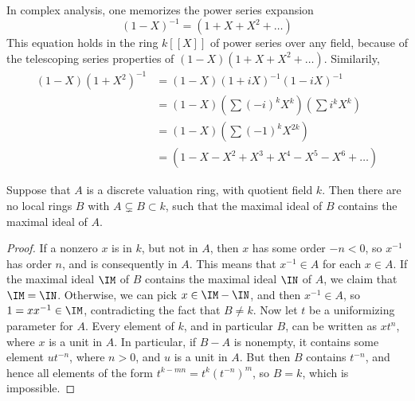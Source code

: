 \begin{example}
    In complex analysis, one memorizes the power series expansion
    \[ (1-X)^{-1} = (1 + X + X^2 + \dots) \]
    This equation holds in the ring $k[[X]]$ of power series over any field, because of the telescoping series properties of $(1-X)(1 + X + X^2 + \dots)$. Similarily,
    \begin{align*}
        (1-X)(1 + X^2)^{-1} &= (1-X)(1 + iX)^{-1}(1 - iX)^{-1}\\
        &= (1-X) \left( \sum (-i)^k X^k \right) \left( \sum i^k X^k \right)\\
        &= (1-X) \left( \sum (-1)^k X^{2k} \right)\\
        &= (1 - X - X^2 + X^3 + X^4 - X^5 - X^6 + \dots)
    \end{align*}
\end{example}

\begin{prop}
    Suppose that $A$ is a discrete valuation ring, with quotient field $k$. Then there are no local rings $B$ with $A \subsetneq B \subset k$, such that the maximal ideal of $B$ contains the maximal ideal of $A$.
\end{prop}
\begin{proof}
    If a nonzero $x$ is in $k$, but not in $A$, then $x$ has some order $-n < 0$, so $x^{-1}$ has order $n$, and is consequently in $A$. This means that $x^{-1} \in A$ for each $x \in A$. If the maximal ideal $\IM$ of $B$ contains the maximal ideal $\IN$ of $A$, we claim that $\IM = \IN$. Otherwise, we can pick $x \in \IM - \IN$, and then $x^{-1} \in A$, so $1 = xx^{-1} \in \IM$, contradicting the fact that $B \neq k$. Now let $t$ be a uniformizing parameter for $A$. Every element of $k$, and in particular $B$, can be written as $xt^n$, where $x$ is a unit in $A$. In particular, if $B - A$ is nonempty, it contains some element $ut^{-n}$, where $n > 0$, and $u$ is a unit in $A$. But then $B$ contains $t^{-n}$, and hence all elements of the form $t^{k-mn} = t^k(t^{-n})^m$, so $B = k$, which is impossible.
\end{proof}

